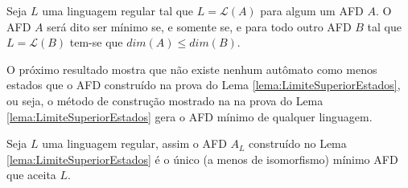\begin{definition}
	Seja $L$ uma linguagem regular tal que $L = \mathcal{L}(A)$ para algum um AFD $A$. O AFD $A$ será dito ser mínimo se, e somente se,  e para todo outro AFD $B$ tal que $L= \mathcal{L}(B)$ tem-se que $dim(A) \leq dim(B)$. 
\end{definition}

O próximo resultado mostra que não existe nenhum autômato como menos estados que o AFD construído na prova do Lema \ref{lema:LimiteSuperiorEstados}, ou seja, o método de construção mostrado na  na prova do Lema \ref{lema:LimiteSuperiorEstados} gera o AFD mínimo de qualquer linguagem.

\begin{lema}\label{lema:UnicadadeMinAFD}
	Seja $L$ uma linguagem regular, assim o  AFD $A_L$ construído no Lema \ref{lema:LimiteSuperiorEstados} é o único (a menos de isomorfismo) mínimo AFD que aceita $L$.
\end{lema}

